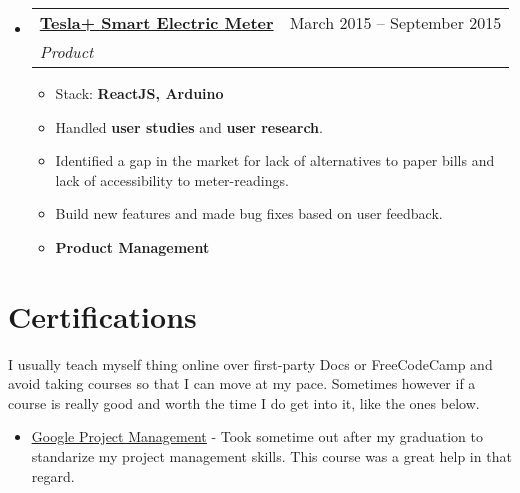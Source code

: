 \documentclass[a4paper,11pt]{article}
\makeatletter
\newcommand{\resumeItem}[1]{
  \item\large{#1}
}
\newcommand{\resumeItemListStart}{\begin{itemize}[rightmargin=0.11in]}
\newcommand{\resumeItemListEnd}{\end{itemize}}
\newcommand{\resumeQuadHeading}[4]{
  \item
  \begin{tabular*}{0.96\textwidth}[t]{l@{\extracolsep{\fill}}r}
    \textbf{#1} & #2 \\
    \textit{\large#3} & \textit{\large #4} \\
  \end{tabular*}
}
\newcommand{\resumeHeadingListStart}{
  \begin{itemize}[leftmargin=0.15in, label={}]
}
\newcommand{\resumeHeadingListEnd}{\end{itemize}}
\makeatother
\begin{document}
  \resumeHeadingListStart{}
  \resumeQuadHeading{{\uline{Tesla+ Smart Electric Meter
}}}{March 2015 -- September 2015
}
  {Product}{}
      \resumeItemListStart{}
		\large{A smart electric meter add-on that connects to a standard electric meter and reports all usage metrics to a local hub which makes the data available via a mobile app and also to administration. Qualified for the CBSE National Science Fair's National level with this project!}
		\resumeItem{Stack: \textbf{ReactJS,
		Arduino}}
		\resumeItem{Handled \textbf{user studies} and \textbf{user research}.}
		\resumeItem{Identified a gap in the market for lack of alternatives to paper bills and lack of accessibility to meter-readings.}
		\resumeItem{Build new features and made bug fixes based on user feedback.}
		\resumeItem{\textbf{Product Management}}
      \resumeItemListEnd{}
  \resumeHeadingListEnd{}



\section{\LARGE{Certifications}}
  \large{I usually teach myself thing online over first-party Docs or FreeCodeCamp and avoid taking courses so that I can move at my pace. Sometimes however if a course is really good and worth the time I do get into it, like the ones below.
	}
  \resumeItemListStart{}
    \resumeItem{\href{https://www.coursera.org/account/accomplishments/specialization/certificate/HYKASZDT4AXM}{\uline{Google Project Management}} - Took sometime out after my graduation to standarize my project management skills. This course was a great help in that regard.}
  \resumeItemListEnd{}

\end{document}
